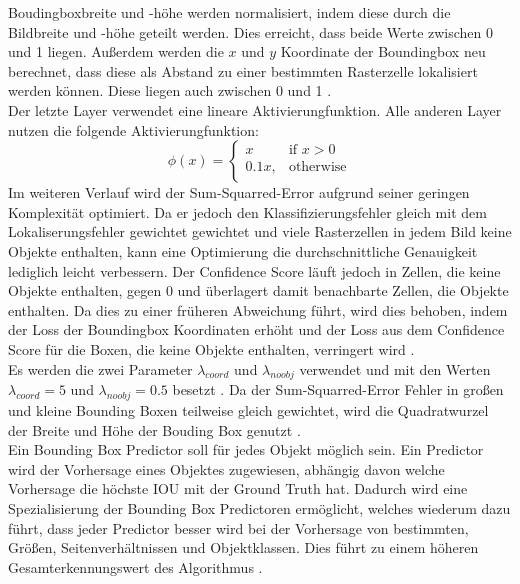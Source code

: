 {{	Boudingboxbreite und -höhe werden normalisiert, indem diese durch die Bildbreite und -höhe geteilt werden. Dies erreicht, dass beide Werte zwischen 0 und 1 liegen. Außerdem werden die $x$ und $y$ Koordinate der Boundingbox neu berechnet, dass diese als Abstand zu einer bestimmten Rasterzelle lokalisiert werden können. Diese liegen auch zwischen 0 und 1 \citep{Redmon2016}. \\
	Der letzte Layer verwendet eine lineare Aktivierungfunktion. Alle anderen Layer nutzen die folgende Aktivierungfunktion: 
	\begin{equation}
		\phi(x) = \begin{cases}
			x & \text{if $x > 0$} \\
			0.1x, & \text{otherwise} \\
		\end{cases}
	\end{equation} 
	Im weiteren Verlauf wird der Sum-Squarred-Error aufgrund seiner geringen Komplexität optimiert. Da er jedoch den Klassifizierungsfehler gleich mit dem Lokaliserungsfehler gewichtet gewichtet und viele Rasterzellen in jedem Bild keine Objekte enthalten, kann eine Optimierung die durchschnittliche Genauigkeit lediglich leicht verbessern. Der Confidence Score läuft jedoch in Zellen, die keine Objekte enthalten, gegen 0 und überlagert damit benachbarte Zellen, die Objekte enthalten. Da dies zu einer früheren Abweichung  führt, wird dies behoben, indem der Loss der Boundingbox Koordinaten erhöht und der Loss aus dem Confidence Score für die Boxen, die keine Objekte enthalten, verringert wird \citep{Redmon2016}. \\
	Es werden die zwei Parameter $\lambda_{coord}$ und $\lambda_{noobj}$ verwendet und  mit den Werten  $\lambda_{coord} = 5$ und $\lambda_{noobj} = 0.5$ besetzt \citep{Redmon2016}.
	Da der Sum-Squarred-Error Fehler in großen und kleine Bounding Boxen teilweise gleich gewichtet, wird die Quadratwurzel der Breite und Höhe der Bouding Box genutzt \citep{Redmon2016}. \\
	Ein Bounding Box Predictor soll für jedes Objekt möglich sein. Ein Predictor wird  der Vorhersage eines Objektes zugewiesen, abhängig davon welche Vorhersage die höchste IOU mit der Ground Truth hat. Dadurch wird eine Spezialisierung der Bounding Box Predictoren ermöglicht, welches wiederum dazu führt, dass jeder Predictor besser wird bei der Vorhersage von bestimmten, Größen, Seitenverhältnissen und Objektklassen. Dies führt zu einem höheren Gesamterkennungswert des Algorithmus \citep{Redmon2016}. \\
}}
